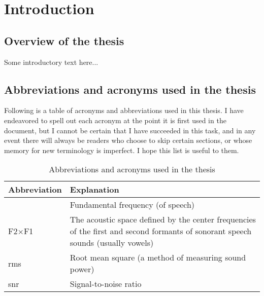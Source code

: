 \chapter{Introduction}
\section[Overview]{Overview of the thesis \label{sec:Overview}}
Some introductory text here...

\section[Abbreviations \& acronyms]{Abbreviations and acronyms used in the thesis \label{sec:Abbr}}
Following is a table of acronyms and abbreviations used in this thesis.  I have endeavored to spell out each acronym at the point it is first used in the document, but I cannot be certain that I have succeeded in this task, and in any event there will always be readers who choose to skip certain sections, or whose memory for new terminology is imperfect.  I hope this list is useful to them.

\begin{table}
	\caption[Abbreviations and acronyms]{Abbreviations and acronyms used in the thesis \label{tab:Abbr}}
	\centering
	\begin{tabu} to 0.8\textwidth [c]{X[c] X[4]}
		\toprule
		\rowfont[c]{\bfseries} Abbreviation & Explanation\\
		\midrule
		\fo & Fundamental frequency (of speech)\\
		F2×F1 & The acoustic space defined by the center frequencies of the first and second formants of sonorant speech sounds (usually vowels)\\
		\ac{rms} & Root mean square (a method of measuring sound power)\\
		\ac{snr} & Signal-to-noise ratio\\		
		\bottomrule
	\end{tabu}
\end{table}
